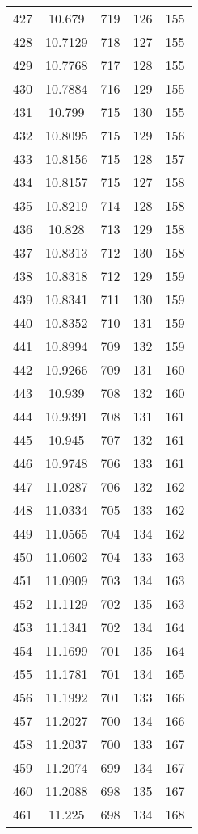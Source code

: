 \documentclass[12pt,a4paper]{article}
\begin{document}
\begin{tabular}{r|cccc}
	427 & 10.679 & 719 & 126 & 155 \\
	428 & 10.7129 & 718 & 127 & 155 \\
	429 & 10.7768 & 717 & 128 & 155 \\
	430 & 10.7884 & 716 & 129 & 155 \\
	431 & 10.799 & 715 & 130 & 155 \\
	432 & 10.8095 & 715 & 129 & 156 \\
	433 & 10.8156 & 715 & 128 & 157 \\
	434 & 10.8157 & 715 & 127 & 158 \\
	435 & 10.8219 & 714 & 128 & 158 \\
	436 & 10.828 & 713 & 129 & 158 \\
	437 & 10.8313 & 712 & 130 & 158 \\
	438 & 10.8318 & 712 & 129 & 159 \\
	439 & 10.8341 & 711 & 130 & 159 \\
	440 & 10.8352 & 710 & 131 & 159 \\
	441 & 10.8994 & 709 & 132 & 159 \\
	442 & 10.9266 & 709 & 131 & 160 \\
	443 & 10.939 & 708 & 132 & 160 \\
	444 & 10.9391 & 708 & 131 & 161 \\
	445 & 10.945 & 707 & 132 & 161 \\
	446 & 10.9748 & 706 & 133 & 161 \\
	447 & 11.0287 & 706 & 132 & 162 \\
	448 & 11.0334 & 705 & 133 & 162 \\
	449 & 11.0565 & 704 & 134 & 162 \\
	450 & 11.0602 & 704 & 133 & 163 \\
	451 & 11.0909 & 703 & 134 & 163 \\
	452 & 11.1129 & 702 & 135 & 163 \\
	453 & 11.1341 & 702 & 134 & 164 \\
	454 & 11.1699 & 701 & 135 & 164 \\
	455 & 11.1781 & 701 & 134 & 165 \\
	456 & 11.1992 & 701 & 133 & 166 \\
	457 & 11.2027 & 700 & 134 & 166 \\
	458 & 11.2037 & 700 & 133 & 167 \\
	459 & 11.2074 & 699 & 134 & 167 \\
	460 & 11.2088 & 698 & 135 & 167 \\
	461 & 11.225 & 698 & 134 & 168 \\

\end{tabular}
\end{document}
